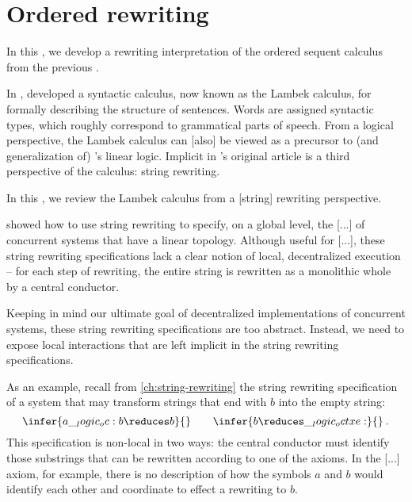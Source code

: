 \chapter{Ordered rewriting}\label{ch:ordered-rewriting}

In this , we develop a rewriting interpretation of the ordered sequent calculus from the previous .

In \citeyear{Lambek:AMM58}, \citeauthor{Lambek:AMM58} developed a syntactic calculus, now known as the Lambek calculus, for formally describing the structure of sentences.\autocite{Lambek:AMM58}
Words are assigned syntactic types, which roughly correspond to grammatical parts of speech.
From a logical perspective, the Lambek calculus can [also] be viewed as a precursor to (and generalization of) \citeauthor{Girard:TCS87}'s linear logic\autocite{Girard:TCS87}\relax.\autocites{Polakow+Pfenning:MFPS99}{Polakow+Pfenning:TLCA99}
Implicit in \citeauthor{Lambek:AMM58}'s original article is a third perspective of the calculus: string rewriting.

In this , we review the Lambek calculus from a [string] rewriting perspective.

 showed how to use string rewriting to specify, on a global level, the [...] of concurrent systems that have a linear topology.
Although useful for [...], these string rewriting specifications lack a clear notion of local, decentralized execution -- for each step of rewriting, the entire string is rewritten as a monolithic whole by a central conductor.

Keeping in mind our ultimate goal of decentralized implementations of concurrent systems, these string rewriting specifications are too abstract.
Instead, we need to expose local interactions that are left implicit in the string rewriting specifications.

As an example, recall from \cref{ch:string-rewriting} the string rewriting specification of a system that may transform strings that end with $b$ into the empty string:
\begin{equation}
  \infer{a \oc b \reduces b}{}
  \qquad
  \infer{b \reduces \octxe}{}
  \:.
\end{equation}
This specification is non-local in two ways:
the central conductor must identify those substrings that can be rewritten according to one of the axioms.
In the [...] axiom, for example, there is no description of how the symbols $a$ and $b$ would identify each other and coordinate to effect a rewriting to $b$.

